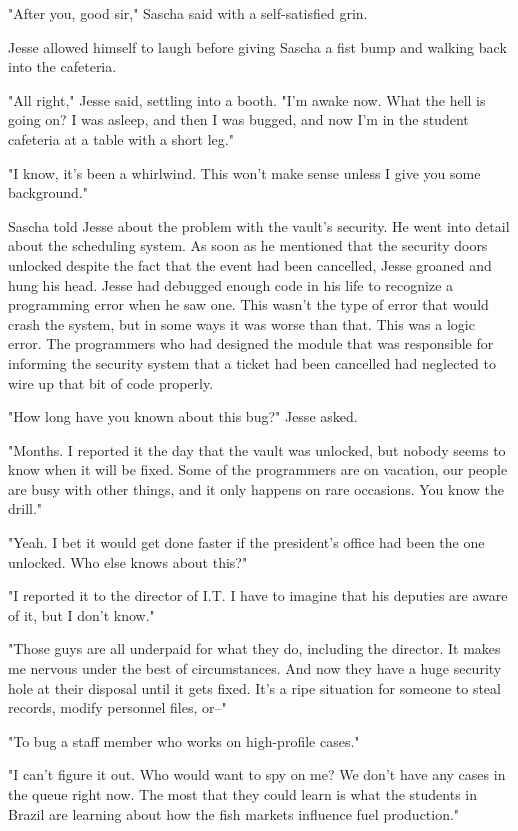 "After you, good sir," Sascha said with a self-satisfied grin.

Jesse allowed himself to laugh before giving Sascha a fist bump and walking back into the cafeteria.

"All right," Jesse said, settling into a booth.  "I'm awake now.  What the hell is going on?  I was asleep, and then I was bugged, and now I'm in the student cafeteria at a table with a short leg."

"I know, it's been a whirlwind.  This won't make sense unless I give you some background."

Sascha told Jesse about the problem with the vault's security.  He went into detail about the scheduling system.  As soon as he mentioned that the security doors unlocked despite the fact that the event had been cancelled, Jesse groaned and hung his head.  Jesse had debugged enough code in his life to recognize a programming error when he saw one.  This wasn't the type of error that would crash the system, but in some ways it was worse than that.  This was a logic error.  The programmers who had designed the module that was responsible for informing the security system that a ticket had been cancelled had neglected to wire up that bit of code properly.

"How long have you known about this bug?" Jesse asked.

"Months.  I reported it the day that the vault was unlocked, but nobody seems to know when it will be fixed.  Some of the programmers are on vacation, our people are busy with other things, and it only happens on rare occasions.  You know the drill."

"Yeah.  I bet it would get done faster if the president's office had been the one unlocked.  Who else knows about this?"

"I reported it to the director of I.T.  I have to imagine that his deputies are aware of it, but I don't know."

"Those guys are all underpaid for what they do, including the director.  It makes me nervous under the best of circumstances.  And now they have a huge security hole at their disposal until it gets fixed.  It's a ripe situation for someone to steal records, modify personnel files, or--"

"To bug a staff member who works on high-profile cases."

"I can't figure it out.  Who would want to spy on me?  We don't have any cases in the queue right now.  The most that they could learn is what the students in Brazil are learning about how the fish markets influence fuel production."

